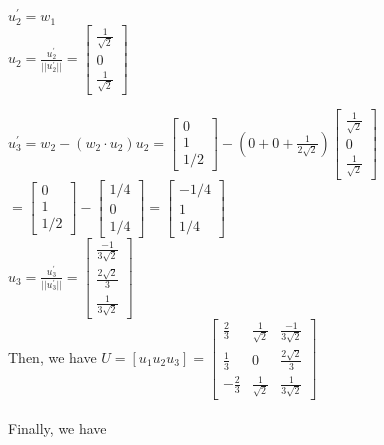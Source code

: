 \documentclass[12pt]{article}
\begin{document}
\begin{enumerate}[label=(\alph*)]
$u_2^{'} =  w_1$ \\
$u_2 = \frac{u_2^{'}}{||u_2^{'}||} = \begin{bmatrix}
   \frac{1}{\sqrt{2}}\\ 0 \\ \frac{1}{\sqrt{2}}
\end{bmatrix} $

$u_3^{'} = w_2 - (w_2 \cdot u_2) u_2  = \begin{bmatrix}
   0 \\ 1 \\ 1/2
\end{bmatrix} - (0 + 0 + \frac{1}{2\sqrt{2}}) \begin{bmatrix}
   \frac{1}{\sqrt{2}}\\ 0 \\ \frac{1}{\sqrt{2}}
\end{bmatrix} $ \\
$ = \begin{bmatrix}
   0 \\ 1 \\ 1/2
\end{bmatrix} -  \begin{bmatrix}
   1/4 \\ 0 \\ 1/4 
\end{bmatrix}  = \begin{bmatrix}
   -1/4 \\ 1 \\ 1/4 
\end{bmatrix} $ \\
$u_3 = \frac{u_3^{'}}{||u_3^{'}||}  = \begin{bmatrix}
    \frac{-1}{3\sqrt{2}} \\ \frac{2\sqrt{2}}{3} \\ \frac{1}{3\sqrt{2}}
\end{bmatrix}$ \\

Then, we have $U = [u_1 u_2 u_3] = \begin{bmatrix}
    \frac{2}{3} & \frac{1}{\sqrt{2}} & \frac{-1}{3\sqrt{2}} \\
    \frac{1}{3} & 0 & \frac{2\sqrt{2}}{3} \\
    -\frac{2}{3} & \frac{1}{\sqrt{2}} & \frac{1}{3\sqrt{2}}
\end{bmatrix}$ \\
\\ 
Finally, we have \\


\end{enumerate}
\end{document}
